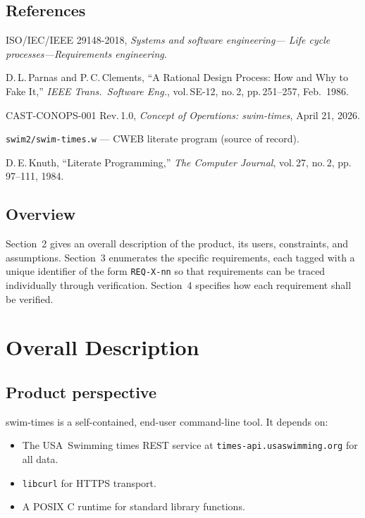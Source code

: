 \documentclass[12pt]{article}
\newcommand{\code}[1]{\texttt{#1}}
\begin{document}
\subsection{References}

\begin{enumerate}[label={[\arabic*]}]
  \item ISO/IEC/IEEE 29148-2018, \textit{Systems and software engineering---
        Life cycle processes---Requirements engineering}.
  \item D.\,L.\,Parnas and P.\,C.\,Clements, ``A Rational Design Process:
        How and Why to Fake It,'' \textit{IEEE Trans.\ Software Eng.},
        vol.\,SE-12, no.\,2, pp.\,251--257, Feb.\ 1986.
  \item CAST-CONOPS-001 Rev.\,1.0, \textit{Concept of Operations:
        swim-times}, April 21, 2026.
  \item \code{swim2/swim-times.w} --- CWEB literate program (source of record).
  \item D.\,E.\,Knuth, ``Literate Programming,''
        \textit{The Computer Journal}, vol.\,27, no.\,2,
        pp.\,97--111, 1984.
\end{enumerate}

\subsection{Overview}

Section~2 gives an overall description of the product, its users,
constraints, and assumptions.  Section~3 enumerates the specific
requirements, each tagged with a unique identifier of the form
\code{REQ-X-nn} so that requirements can be traced individually
through verification.  Section~4 specifies how each requirement
shall be verified.

\section{Overall Description}

\subsection{Product perspective}

swim-times is a self-contained, end-user command-line tool.
It depends on:

\begin{itemize}
  \item The USA~Swimming times REST service at
        \texttt{times-api.usaswimming.org} for all data.
  \item \code{libcurl} for HTTPS transport.
  \item A POSIX C runtime for standard library functions.
\end{itemize}
\end{document}
